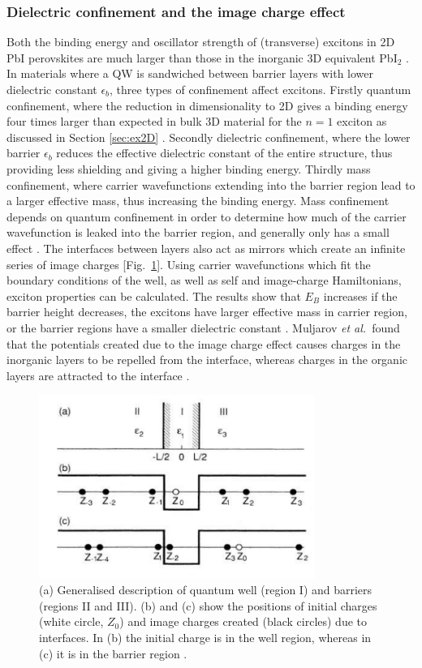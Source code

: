 \subsubsection{Dielectric confinement and the image charge effect}

Both the binding energy and oscillator strength of (transverse) excitons in 2D PbI perovskites are much larger than those in the inorganic 3D equivalent Pb$\textrm{I}_2$ \cite{Hirasawa1994}. In materials where a QW is sandwiched between barrier layers with lower dielectric constant $\epsilon_b$, three types of confinement affect excitons. Firstly quantum confinement, where the reduction in dimensionality to 2D gives a binding energy four times larger than expected in bulk 3D material for the $n=1$ exciton as discussed in Section \ref{sec:ex2D} \cite{Shinada1966}. Secondly dielectric confinement, where the lower barrier $\epsilon_b$ reduces the effective dielectric constant of the entire structure, thus providing less shielding and giving a higher binding energy. Thirdly mass confinement, where carrier wavefunctions extending into the barrier region lead to a larger effective mass, thus increasing the binding energy. Mass confinement depends on quantum confinement in order to determine how much of the carrier wavefunction is leaked into the barrier region, and generally only has a small effect \cite{Kumagai1989}. The interfaces between layers also act as mirrors which create an infinite series of image charges [Fig.\ \ref{2Fig17}]. Using carrier wavefunctions which fit the boundary conditions of the well, as well as self and image-charge Hamiltonians, exciton properties can be calculated. The results show that $E_B$ increases if the barrier height decreases, the excitons have larger effective mass in carrier region, or the barrier regions have a smaller dielectric constant \cite{Kumagai1989}. Muljarov \textit{et al.}\ found that the potentials created due to the image charge effect causes charges in the inorganic layers to be repelled from the interface, whereas charges in the organic layers are attracted to the interface \cite{Muljarov1995}.
\begin{figure}[h!]
\centering
\includegraphics[width=0.8\textwidth]{Fig17}
\caption{(a) Generalised description of quantum well (region I) and barriers (regions II and III). (b) and (c) show the positions of initial charges (white circle, $Z_0$) and image charges created (black circles) due to interfaces. In (b) the initial charge is in the well region, whereas in (c) it is in the barrier region \cite{Kumagai1989}.}
\label{2Fig17}
\end{figure}


